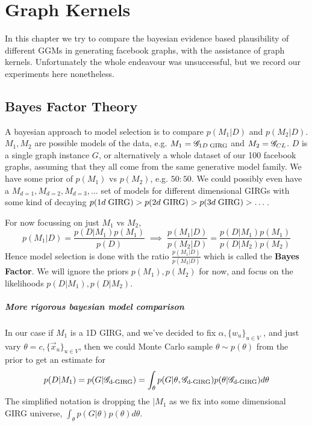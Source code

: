 \chapter{Graph Kernels}
\label{chap:graph_kernels}
\minitoc

In this chapter we try to compare the bayesian evidence based plausibility of different GGMs in generating facebook graphs, with the assistance of graph kernels. Unfortunately the whole endeavour was unsuccessful, but we record our experiments here nonetheless.

\section{Bayes Factor Theory}
A bayesian approach to model selection is to compare $p(M_1 | D)$ and $p(M_2 | D)$. $M_1, M_2$ are possible models of the data, e.g. $M_1 = \mathscr{G}_{1D\; \mathrm{GIRG}}$ and $M_2 = \mathscr{G}_{CL}$. $D$ is a single graph instance $G$, or alternatively a whole dataset of our 100 facebook graphs, assuming that they all come from the same generative model family. We have some prior of $p(M_1)$ vs $p(M_2)$, e.g. $50 : 50$. We could possibly even have a $M_{d=1}, M_{d=2}, M_{d=3}, ...$ set of models for different dimensional GIRGs with some kind of decaying $p(1d\; \mathrm{GIRG}) > p(2d\; \mathrm{GIRG}) > p(3d\; \mathrm{GIRG}) > \dots$.

For now focussing on just $M_1$ vs $M_2$,
\begin{equation}
  p(M_1 | D) = \frac{p(D | M_1) p(M_1)}{p(D)} 
  \;
  \implies
  \;
  \frac{p(M_1 | D)}{p(M_2 | D)} = \frac{p(D | M_1) p(M_1)}{p(D | M_2) p(M_2)}
\end{equation}
Hence model selection is done with the ratio $\frac{p(M_1 | D)}{p(M_2 | D)}$ which is called the \textbf{Bayes Factor}.
We will ignore the priors $p(M_1), p(M_2)$ for now, and focus on the likelihoods $p(D | M_1), p(D | M_2)$.



\paragraph{More rigorous bayesian model comparison}
In our case if $M_1$ is a 1D GIRG, and we've decided to fix 
$\alpha, \{w_u\}_{u \in V}$
, and just vary $\theta = c, \{\vec{x}_u\}_{u \in V}$, then we could Monte Carlo sample $\theta \sim p(\theta)$ from the prior to get an estimate for
\begin{equation} \label{eq:incorrect_girg_model_likelihood}
  p(D| M_1) = p(G | \mathscr{G}_{\text{d-}\mathrm{GIRG}}) = \int_\theta p(G | \theta, \mathscr{G}_{\text{d-}\mathrm{GIRG}}) p(\theta | \mathscr{G}_{\text{d-}\mathrm{GIRG}}) d\theta
\end{equation}
The simplified notation is dropping the $| M_1$ as we fix into some dimensional GIRG universe, $\int_\theta p(G | \theta) p(\theta) d\theta$.

